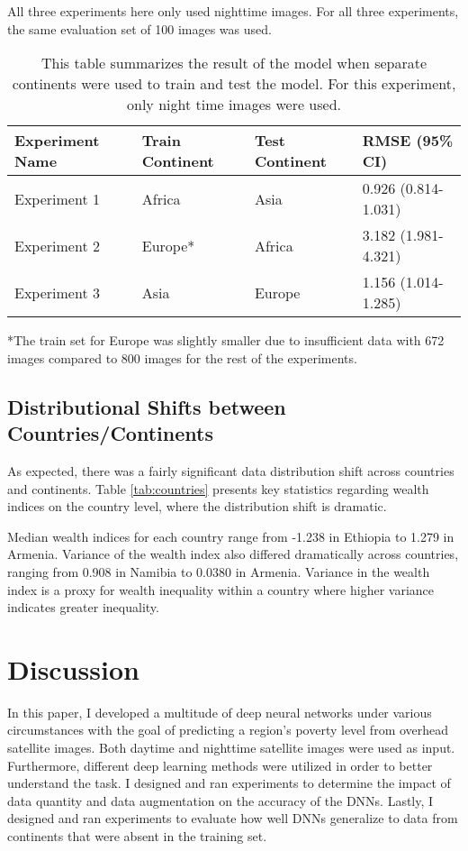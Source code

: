 \documentclass{article}
\begin{document}
All three experiments here only used nighttime images. For all three experiments, the same evaluation set of 100 images was used.

\begin{table}[]
\centering
\begin{tabular}{@{}llll@{}}
\toprule
Experiment Name & Train Continent & Test Continent & RMSE (95\% CI)      \\ \midrule
Experiment 1    & Africa          & Asia           & 0.926 (0.814-1.031) \\
Experiment 2    & Europe*         & Africa         & 3.182 (1.981-4.321) \\
Experiment 3    & Asia            & Europe         & 1.156 (1.014-1.285) \\ \bottomrule
\end{tabular}

\footnotesize{*The train set for Europe was slightly smaller due to insufficient data with 672 images compared to 800 images for the rest of the experiments.}
\caption{This table summarizes the result of the model when separate continents were used to train and test the model. For this experiment, only night time images were used.}
\label{tab:continent}
\end{table}

\subsection{Distributional Shifts between Countries/Continents}
As expected, there was a fairly significant data distribution shift across countries and continents. Table \ref{tab:countries} presents key statistics regarding wealth indices on the country level, where the distribution shift is dramatic.

Median wealth indices for each country range from -1.238 in Ethiopia to 1.279 in Armenia. Variance of the wealth index also differed dramatically across countries, ranging from 0.908 in Namibia to 0.0380 in Armenia. Variance in the wealth index is a proxy for wealth inequality within a country where higher variance indicates greater inequality.


\section{Discussion}
In this paper, I developed a multitude of deep neural networks under various circumstances with the goal of predicting a region's poverty level from overhead satellite images. Both daytime and nighttime satellite images were used as input. Furthermore, different deep learning methods were utilized in order to better understand the task. I designed and ran experiments to determine the impact of data quantity and data augmentation on the accuracy of the DNNs. Lastly, I designed and ran experiments to evaluate how well DNNs generalize to data from continents that were absent in the training set.
\end{document}
